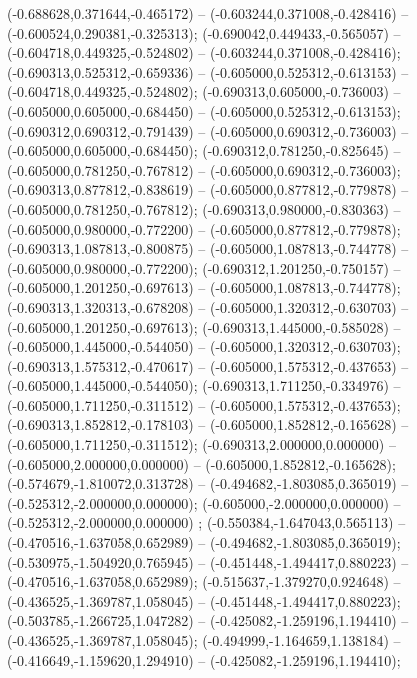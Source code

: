  (-0.688628,0.371644,-0.465172) -- (-0.603244,0.371008,-0.428416) -- (-0.600524,0.290381,-0.325313);
 (-0.690042,0.449433,-0.565057) -- (-0.604718,0.449325,-0.524802) -- (-0.603244,0.371008,-0.428416);
 (-0.690313,0.525312,-0.659336) -- (-0.605000,0.525312,-0.613153) -- (-0.604718,0.449325,-0.524802);
 (-0.690313,0.605000,-0.736003) -- (-0.605000,0.605000,-0.684450) -- (-0.605000,0.525312,-0.613153);
 (-0.690312,0.690312,-0.791439) -- (-0.605000,0.690312,-0.736003) -- (-0.605000,0.605000,-0.684450);
 (-0.690312,0.781250,-0.825645) -- (-0.605000,0.781250,-0.767812) -- (-0.605000,0.690312,-0.736003);
 (-0.690313,0.877812,-0.838619) -- (-0.605000,0.877812,-0.779878) -- (-0.605000,0.781250,-0.767812);
 (-0.690313,0.980000,-0.830363) -- (-0.605000,0.980000,-0.772200) -- (-0.605000,0.877812,-0.779878);
 (-0.690313,1.087813,-0.800875) -- (-0.605000,1.087813,-0.744778) -- (-0.605000,0.980000,-0.772200);
 (-0.690312,1.201250,-0.750157) -- (-0.605000,1.201250,-0.697613) -- (-0.605000,1.087813,-0.744778);
 (-0.690313,1.320313,-0.678208) -- (-0.605000,1.320312,-0.630703) -- (-0.605000,1.201250,-0.697613);
 (-0.690313,1.445000,-0.585028) -- (-0.605000,1.445000,-0.544050) -- (-0.605000,1.320312,-0.630703);
 (-0.690313,1.575312,-0.470617) -- (-0.605000,1.575312,-0.437653) -- (-0.605000,1.445000,-0.544050);
 (-0.690313,1.711250,-0.334976) -- (-0.605000,1.711250,-0.311512) -- (-0.605000,1.575312,-0.437653);
 (-0.690313,1.852812,-0.178103) -- (-0.605000,1.852812,-0.165628) -- (-0.605000,1.711250,-0.311512);
 (-0.690313,2.000000,0.000000) -- (-0.605000,2.000000,0.000000) -- (-0.605000,1.852812,-0.165628);
 (-0.574679,-1.810072,0.313728) -- (-0.494682,-1.803085,0.365019) -- (-0.525312,-2.000000,0.000000);
 (-0.605000,-2.000000,0.000000) -- (-0.525312,-2.000000,0.000000) ;
 (-0.550384,-1.647043,0.565113) -- (-0.470516,-1.637058,0.652989) -- (-0.494682,-1.803085,0.365019);
 (-0.530975,-1.504920,0.765945) -- (-0.451448,-1.494417,0.880223) -- (-0.470516,-1.637058,0.652989);
 (-0.515637,-1.379270,0.924648) -- (-0.436525,-1.369787,1.058045) -- (-0.451448,-1.494417,0.880223);
 (-0.503785,-1.266725,1.047282) -- (-0.425082,-1.259196,1.194410) -- (-0.436525,-1.369787,1.058045);
 (-0.494999,-1.164659,1.138184) -- (-0.416649,-1.159620,1.294910) -- (-0.425082,-1.259196,1.194410);
